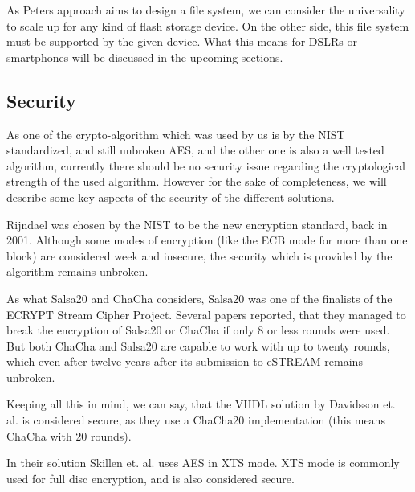 \documentclass[12pt,a4paper,titlepage,oneside]{scrartcl}
\begin{document}
As Peters approach \cite{peters2015defy} aims to design a file system, we can consider the universality to scale up for any kind of flash storage device.
On the other side, this file system must be supported by the given device.
What this means for DSLRs or smartphones will be discussed in the upcoming sections.

\subsection{Security}
As one of the crypto-algorithm which was used by us is by the NIST standardized, and still unbroken AES, and the other one is also a well tested algorithm, currently there should be no security issue regarding the cryptological strength of the used algorithm.
However for the sake of completeness, we will describe some key aspects of the security of the different solutions.

Rijndael was chosen by the NIST to be the new encryption standard, back in 2001.
Although some modes of encryption (like the ECB mode for more than one block) are considered week and insecure, the security which is provided by the algorithm remains unbroken.

As what Salsa20 and ChaCha considers, Salsa20 was one of the finalists of the ECRYPT Stream Cipher Project. \cite{bernstein2008salsa20}
Several papers reported, that they managed to break the encryption of Salsa20 or ChaCha if only 8 or less rounds were used. \cite{aumasson2008new, crowley2006truncated, fischer2006non, tsunoo2007differential}
But both ChaCha and Salsa20 are capable to work with up to twenty rounds, which even after twelve years after its submission to eSTREAM remains unbroken.

Keeping all this in mind, we can say, that the VHDL solution by Davidsson et. al. is considered secure, as they use a ChaCha20 implementation (this means ChaCha with 20 rounds). \cite{Davidsson2016}

In their solution Skillen et. al. uses AES in XTS mode.
XTS mode is commonly used for full disc encryption, and is also considered secure. \cite{alomari2014implementation}
\end{document}
